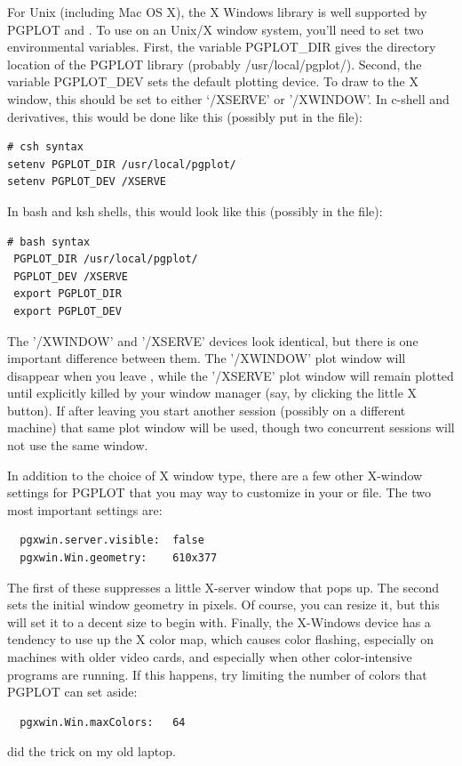 For Unix (including Mac OS X), the X Windows library is well supported by
PGPLOT and {\ifeffit}.  To use {\ifeffit} on an Unix/X window system,
you'll need to set two environmental variables.  First, the variable
PGPLOT\_DIR gives the directory location of the PGPLOT library (probably
/usr/local/pgplot/).  Second, the variable PGPLOT\_DEV sets the default
plotting device.  To draw to the X window, this should be set to either
`/XSERVE' or '/XWINDOW'.  In c-shell and derivatives, this would be done
like this (possibly put in the {} file):
\begin{verbatim}
# csh syntax
setenv PGPLOT_DIR /usr/local/pgplot/
setenv PGPLOT_DEV /XSERVE
\end{verbatim}
\noindent
In bash and ksh shells, this would look like this (possibly in the
{} file):
\begin{verbatim}
# bash syntax
 PGPLOT_DIR /usr/local/pgplot/
 PGPLOT_DEV /XSERVE
 export PGPLOT_DIR
 export PGPLOT_DEV
\end{verbatim}

The '/XWINDOW' and '/XSERVE' devices look identical, but there is one
important difference between them.  The '/XWINDOW' plot window will
disappear when you leave {\ifeffit}, while the '/XSERVE' plot window will
remain plotted until explicitly killed by your window manager (say, by
clicking the little X button).  If after leaving {\ifeffit} you start
another {\ifeffit} session (possibly on a different machine) that same plot
window will be used, though two concurrent {\ifeffit} sessions will not use
the same window.

In addition to the choice of X window type, there are a few other X-window
settings for PGPLOT that you may way to customize in your
{} or {} file.  The two most important
settings are:
\begin{verbatim}
  pgxwin.server.visible:  false
  pgxwin.Win.geometry:    610x377
\end{verbatim}
\noindent
The first of these suppresses a little X-server window that pops up.  The
second sets the initial window geometry in pixels. Of course, you can
resize it, but this will set it to a decent size to begin with.  Finally,
the X-Windows device has a tendency to use up the X color map, which causes
color flashing, especially on machines with older video cards, and
especially when other color-intensive programs are running.  If this
happens, try limiting the number of colors that PGPLOT can set aside:
\begin{verbatim}
  pgxwin.Win.maxColors:   64
\end{verbatim}
\noindent
did the trick on my old laptop.

